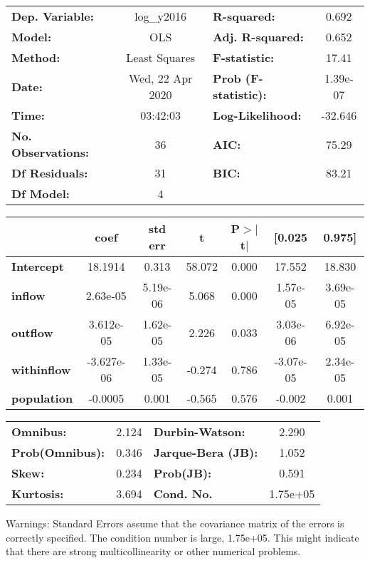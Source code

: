 \begin{center}
\begin{tabular}{lclc}
\toprule
\textbf{Dep. Variable:}    &    log\_y2016    & \textbf{  R-squared:         } &     0.692   \\
\textbf{Model:}            &       OLS        & \textbf{  Adj. R-squared:    } &     0.652   \\
\textbf{Method:}           &  Least Squares   & \textbf{  F-statistic:       } &     17.41   \\
\textbf{Date:}             & Wed, 22 Apr 2020 & \textbf{  Prob (F-statistic):} &  1.39e-07   \\
\textbf{Time:}             &     03:42:03     & \textbf{  Log-Likelihood:    } &   -32.646   \\
\textbf{No. Observations:} &          36      & \textbf{  AIC:               } &     75.29   \\
\textbf{Df Residuals:}     &          31      & \textbf{  BIC:               } &     83.21   \\
\textbf{Df Model:}         &           4      & \textbf{                     } &             \\
\bottomrule
\end{tabular}
\begin{tabular}{lcccccc}
                    & \textbf{coef} & \textbf{std err} & \textbf{t} & \textbf{P$> |$t$|$} & \textbf{[0.025} & \textbf{0.975]}  \\
\midrule
\textbf{Intercept}  &      18.1914  &        0.313     &    58.072  &         0.000        &       17.552    &       18.830     \\
\textbf{inflow}     &     2.63e-05  &     5.19e-06     &     5.068  &         0.000        &     1.57e-05    &     3.69e-05     \\
\textbf{outflow}    &    3.612e-05  &     1.62e-05     &     2.226  &         0.033        &     3.03e-06    &     6.92e-05     \\
\textbf{withinflow} &   -3.627e-06  &     1.33e-05     &    -0.274  &         0.786        &    -3.07e-05    &     2.34e-05     \\
\textbf{population} &      -0.0005  &        0.001     &    -0.565  &         0.576        &       -0.002    &        0.001     \\
\bottomrule
\end{tabular}
\begin{tabular}{lclc}
\textbf{Omnibus:}       &  2.124 & \textbf{  Durbin-Watson:     } &    2.290  \\
\textbf{Prob(Omnibus):} &  0.346 & \textbf{  Jarque-Bera (JB):  } &    1.052  \\
\textbf{Skew:}          &  0.234 & \textbf{  Prob(JB):          } &    0.591  \\
\textbf{Kurtosis:}      &  3.694 & \textbf{  Cond. No.          } & 1.75e+05  \\
\bottomrule
\end{tabular}
\end{center}

Warnings: \newline
 [1] Standard Errors assume that the covariance matrix of the errors is correctly specified. \newline
 [2] The condition number is large, 1.75e+05. This might indicate that there are \newline
 strong multicollinearity or other numerical problems.